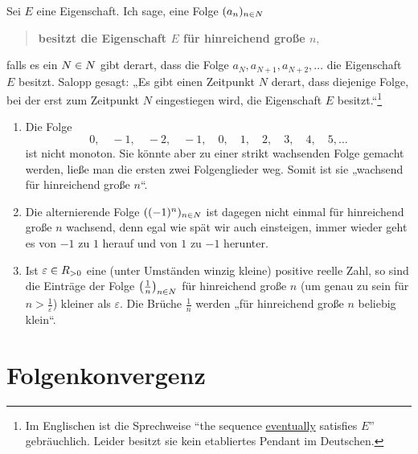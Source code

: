 \begin{defin}[``eventually''] \label{def:eventually}  
    Sei $E$ eine Eigenschaft. Ich sage, eine Folge $(a_n)_{n\in \relax N}$
    \begin{quote}
        \textbf{besitzt die Eigenschaft $E$ für hinreichend große $n$},
    \end{quote}
    falls es ein $N\in \relax N$ gibt derart, dass die Folge $a_N,a_{N+1},a_{N+2},\dots$ die Eigenschaft $E$ besitzt. Salopp gesagt: „Es gibt einen Zeitpunkt $N$ derart, dass diejenige Folge, bei der erst zum Zeitpunkt $N$ eingestiegen wird, die Eigenschaft $E$ besitzt.“\footnote{Im Englischen ist die Sprechweise ``the sequence \href{https://en.wikipedia.org/wiki/Eventually_(mathematics)}{eventually} satisfies $E$'' gebräuchlich. Leider besitzt sie kein etabliertes Pendant im Deutschen.}
\end{defin}


\begin{bsp} \label{bsp:eventually} \quad
    \begin{enumerate}
        \item Die Folge
            \[ 0,\quad -1,\quad -2,\quad -1,\quad 0,\quad 1,\quad 2,\quad 3,\quad 4, \quad 5,\dots \]
        ist nicht monoton. Sie könnte aber zu einer strikt wachsenden Folge gemacht werden, ließe man die ersten zwei Folgenglieder weg. Somit ist sie „wachsend für hinreichend große $n$“.
        \item Die alternierende Folge $((-1)^n)_{n\in \relax N}$ ist dagegen nicht einmal für hinreichend große $n$ wachsend, denn egal wie spät wir auch einsteigen, immer wieder geht es von $-1$ zu $1$ herauf und von $1$ zu $-1$ herunter.
        \item Ist $\varepsilon \in \relax R_{>0}$ eine (unter Umständen winzig kleine) positive reelle Zahl, so sind die Einträge der Folge $\left(\frac{1}{n}\right)_{n\in \relax N}$ für hinreichend große $n$ (um genau zu sein für $n> \frac{1}{\varepsilon}$) kleiner als $\varepsilon$. Die Brüche $\frac{1}{n}$ werden „für hinreichend große $n$ beliebig klein“.
    \end{enumerate}
\end{bsp}





\section{Folgenkonvergenz}


